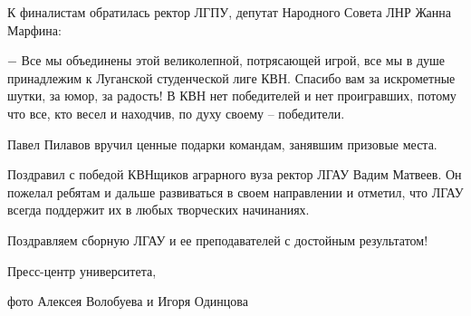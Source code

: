 
К финалистам обратилась ректор ЛГПУ, депутат Народного Совета ЛНР Жанна Марфина:

\begin{zznagolos}
− Все мы объединены этой великолепной, потрясающей игрой, все мы в душе
принадлежим к Луганской студенческой лиге КВН. Спасибо вам за искрометные
шутки, за юмор, за радость! В КВН нет победителей и нет проигравших, потому что
все, кто весел и находчив, по духу своему – победители.	
\end{zznagolos}

Павел Пилавов вручил ценные подарки командам, занявшим призовые места.

Поздравил с победой КВНщиков аграрного вуза ректор ЛГАУ Вадим Матвеев. Он
пожелал ребятам и дальше развиваться в своем направлении и отметил, что ЛГАУ
всегда поддержит их в любых творческих начинаниях.

Поздравляем сборную ЛГАУ и ее преподавателей с достойным результатом!

Пресс-центр университета,

фото Алексея Волобуева и Игоря Одинцова
